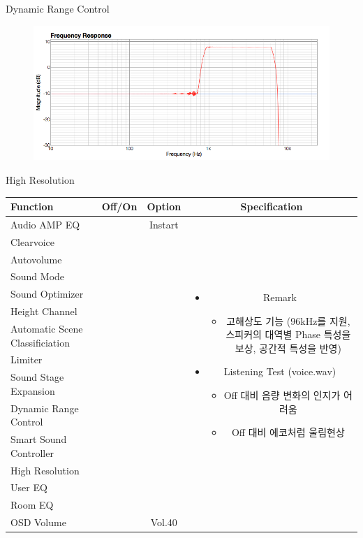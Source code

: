 \documentclass{beamer}
\begin{document}
\begin{frame}[t]{Dynamic Range Control}
\begin{figure}[b]
\includegraphics[height=0.32\textwidth]{figure/drc.png}
\end{figure}

\end{frame}


\begin{frame}[t]{High Resolution}
\begin{tiny}
\begin{tabular}{@{}lccc@{}}
\toprule
Function & Off/On & Option & Specification \\
\midrule
Audio AMP EQ & \color{black}{Off} & Instart &
\multirow{14}{60mm}{
\begin{itemize}
\item Remark
  \begin{itemize}
  \item 고해상도 기능 (96kHz를 지원, 스피커의 대역별 Phase 특성을 보상, 공간적 특성을 반영)
  \end{itemize}
\item Listening Test (voice.wav)
  \begin{itemize}
  \item Off 대비 음량 변화의 인지가 어려움
  \item Off 대비 에코처럼 울림현상
  \end{itemize}
\end{itemize}
} \\
Clearvoice & \color{black}{Off} & & \\
Autovolume & \color{black}{Off} & & \\
Sound Mode & \color{black}{Off} & & \\
Sound Optimizer & \color{black}{Off} & & \\
Height Channel & \color{black}{Off} & & \\
Automatic Scene Classificiation & \color{black}{Off} & & \\
Limiter & \color{black}{Off} & & \\
Sound Stage Expansion & \color{black}{Off} & & \\
Dynamic Range Control & \color{black}{Off} & & \\
Smart Sound Controller & \color{black}{Off} & & \\
High Resolution & \color{blue}{On} & & \\
User EQ & \color{black}{Off} & & \\
Room EQ & \color{black}{Off} & & \\
OSD Volume & \color{blue}{On} & Vol.40 & \\
\midrule
\end{tabular}
\end{tiny}


\end{frame}
\end{document}
